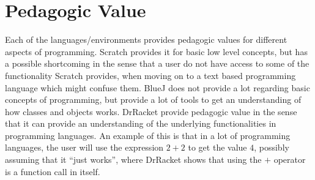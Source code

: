 \section{Pedagogic Value}
\label{sec:pedagogic_value}
Each of the languages/environments provides pedagogic values for different aspects of programming. Scratch provides it for basic low level concepts, but has a possible shortcoming in the sense that a user do not have access to some of the functionality Scratch provides, when moving on to a text based programming language which might confuse them. BlueJ does not provide a lot regarding basic concepts of programming, but provide a lot of tools to get an understanding of how classes and objects works. DrRacket provide pedagogic value in the sense that it can provide an understanding of the underlying functionalities in programming languages. An example of this is that in a lot of programming languages, the user will use the expression $2+2$ to get the value $4$, possibly assuming that it ``just works'', where DrRacket shows that using the $+$ operator is a function call in itself.